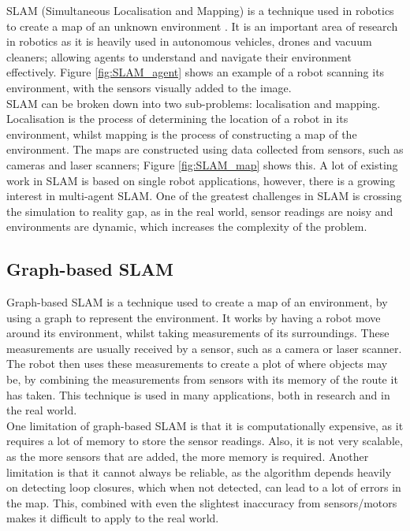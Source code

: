 \documentclass[12pt]{article}
\begin{document}
SLAM (Simultaneous Localisation and Mapping) is a technique used in robotics to create a map of an unknown environment \cite{SLAM_overview}.
It is an important area of research in robotics as it is heavily used in autonomous vehicles, drones and vacuum cleaners;
allowing agents to understand and navigate their environment effectively. Figure \ref{fig:SLAM_agent} shows an example of a
robot scanning its environment, with the sensors visually added to the image.\\
SLAM can be broken down into two sub-problems: localisation and mapping. Localisation is the process of determining the
location of a robot in its environment, whilst mapping is the process of constructing a map of the environment. The maps
are constructed using data collected from sensors, such as cameras and laser scanners; Figure \ref{fig:SLAM_map} shows this.
A lot of existing work in SLAM is based on single robot applications, however, there is a growing interest in multi-agent
SLAM. One of the greatest challenges in SLAM is crossing the simulation to reality gap, as in the real world, sensor
readings are noisy and environments are dynamic, which increases the complexity of the problem.

\subsection{Graph-based SLAM}
Graph-based SLAM is a technique used to create a map of an environment, by using a graph to represent the environment. It
works by having a robot move around its environment, whilst taking measurements of its surroundings. These measurements
are usually received by a sensor, such as a camera or laser scanner. The robot then uses these measurements to create a
plot of where objects may be, by combining the measurements from sensors with its memory of the route it has taken. This
technique is used in many applications, both in research and in the real world.\\
One limitation of graph-based SLAM is that it is computationally expensive, as it requires a lot of memory to store the
sensor readings. Also, it is not very scalable, as the more sensors that are added, the more memory is required. Another
limitation is that it cannot always be reliable, as the algorithm depends heavily on detecting loop closures, which when
not detected, can lead to a lot of errors in the map. This, combined with even the slightest inaccuracy from sensors/motors
makes it difficult to apply to the real world.
\end{document}
